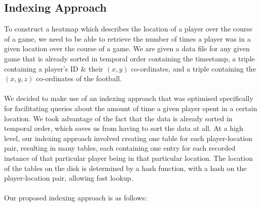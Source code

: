 \documentclass[a4paper,11pt]{article}
\begin{document}
\subsection{Indexing Approach}\label{sec:indexingapproach}
\label{indexing}
To construct a heatmap which describes the location of a player over the course of a game, we need to be able to retrieve the number of times a player was in a given location over the course of a game.
We are given a data file for any given game that is already sorted in temporal order containing the timestamp, a triple containing a player's ID \& their $(x,y)$ co-ordinates, and a triple containing the $(x,y,z)$ co-ordinates of the football.
\\\\
We decided to make use of an indexing approach that was optimised specifically for facilitating queries about the amount of time a given player spent in a certain location.
We took advantage of the fact that the data is already sorted in temporal order, which saves us from having to sort the data at all. 
At a high level, our indexing approach involved creating one table for each player-location pair, resulting in many tables, each containing one entry for each recorded instance of that particular player being in that particular location.
The location of the tables on the disk is determined by a hash function, with a hash on the player-location pair, allowing fast lookup. 
\\\\
Our proposed indexing approach is as follows:
\end{document}
